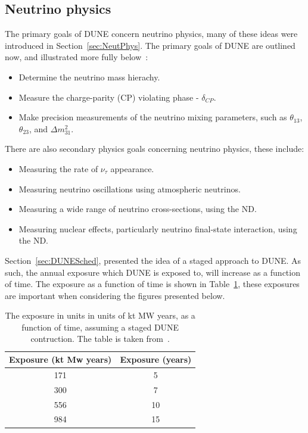 \subsection{Neutrino physics} \label{sec:DUNEPhys_Neut} %
The primary goals of DUNE concern neutrino physics, many of these ideas were introduced in Section~\ref{sec:NeutPhys}. The primary goals of DUNE are outlined now, and illustrated more fully below~\citep{DUNECDR_V2}:
\begin{itemize}
\item Determine the neutrino mass hierachy.
\item Measure the charge-parity (CP) violating phase - $\delta_{CP}$.
\item Make precision measurements of the neutrino mixing parameters, such as $\theta_{13}$, $\theta_{23}$, and $\Delta m^{2}_{31}$.
\end{itemize}
There are also secondary physics goals concerning neutrino physics, these include:
\begin{itemize}
\item Measuring the rate of $\nu_{\tau}$ appearance.
\item Measuring neutrino oscillations using atmospheric neutrinos.
\item Measuring a wide range of neutrino cross-sections, using the ND.
\item Measuring nuclear effects, particularly neutrino final-state interaction, using the ND.
\end{itemize}
Section~\ref{sec:DUNESched}, presented the idea of a staged approach to DUNE. As such, the annual exposure which DUNE is exposed to, will increase as a function of time. The exposure as a function of time is shown in Table~\ref{tab:DUNEExposure}, these exposures are important when considering the figures presented below. \\

\begin{table}
\caption[The exposure in units in units of kt MW years, as a function of time, assuming a staged DUNE contruction]
        {The exposure in units in units of kt MW years, as a function of time, assuming a staged DUNE contruction. The table is taken from~\citep{Elizabeth_01_17}.}
\centering
\label{tab:DUNEExposure}
\begin{tabular}{c c}
\toprule
{Exposure (kt Mw years)} & {Exposure (years)} \\
\midrule
171                      & 5 \\

300                      & 7 \\

556                      & 10 \\

984                      & 15 \\
\bottomrule
\end{tabular}
\end{table}

